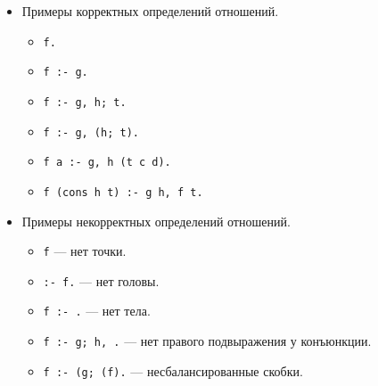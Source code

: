 \documentclass[12pt]{article}
\begin{document}
\begin{enumerate}
{\begin{itemize}
\begin{itemize}
\begin{itemize}
          \item Можно специфицировать список, состоящий из головы \verb!H! и хвоста \verb!T!: \verb![H|T]!. В голове может быть не только переменная, но и произвольный атом, хвост --- обязательно переменная.
          \begin{itemize}
            \item Корректные списки: \verb![H | T]!, \verb![a (b c) | T]!
            \item Некорректные списки: \verb![H | abc]!, \verb![H | A b c]!
          \end{itemize}
          \item Список может вкладываться в другой список: \verb![[X, [H | T]] | Z]!
          \item Список не может быть головой атома, но может быть аргументом.
          \begin{itemize}
            \item Некорректное использование списка: \verb![X] Y :- f X Y.!
            \item Корректное использование списка: \verb!g [X] Y :- f X Y.!
          \end{itemize}
        \end{itemize}
      \end{itemize}
      \item Примеры корректных определений отношений.
      \begin{itemize}
        \item \verb!f.!
        \item \verb!f :- g.!
        \item \verb!f :- g, h; t.!
        \item \verb!f :- g, (h; t).!
        \item \verb!f a :- g, h (t c d).!
        \item \verb!f (cons h t) :- g h, f t.!
      \end{itemize}
      \item Примеры некорректных определений отношений.
      \begin{itemize}
        \item \verb!f! --- нет точки.
        \item \verb!:- f.! --- нет головы.
        \item \verb!f :- .! --- нет тела.
        \item \verb!f :- g; h, .! --- нет правого подвыражения у конъюнкции.
        \item \verb!f :- (g; (f).! --- несбалансированные скобки.

\end{itemize}
\end{itemize}}
\end{enumerate}
\end{document}
